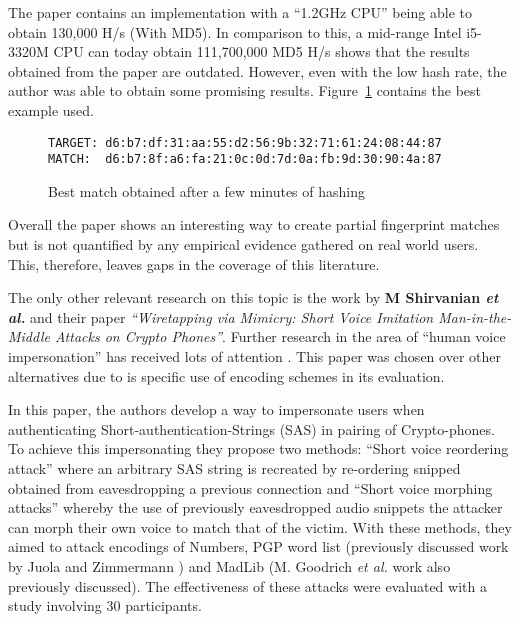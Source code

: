 The paper contains an implementation with a ``1.2GHz CPU'' being able to obtain 130,000 H/s (With MD5). In comparison to this, a mid-range Intel i5-3320M CPU can today obtain 111,700,000 MD5 H/s shows that the results obtained from the paper are outdated. However, even with the low hash rate, the author was able to obtain some promising results. Figure~\ref{ref:fuzz} contains the best example used.

\begin{figure}[!h]
    \begin{center}
        \verb|TARGET: d6:b7:df:31:aa:55:d2:56:9b:32:71:61:24:08:44:87|
        \verb|MATCH:  d6:b7:8f:a6:fa:21:0c:0d:7d:0a:fb:9d:30:90:4a:87|
    \end{center}
    \caption{Best match obtained after a few minutes of hashing}
    \label{ref:fuzz}
\end{figure}

Overall the paper shows an interesting way to create partial fingerprint matches but is not quantified by any empirical evidence gathered on real world users. This, therefore, leaves gaps in the coverage of this literature.

The only other relevant research on this topic is the work by \textbf{M Shirvanian \textit{et al.}}\cite{shirvanian2014wiretapping} 
and their paper \textit{``Wiretapping via Mimicry: Short 
Voice Imitation Man-in-the-Middle Attacks on Crypto 
Phones''}. Further research in the area of ``human voice impersonation'' has received lots of attention \cite{mukhopadhyay2015all}\cite{chen2017you}\cite{wu2015spoofing}. This paper was chosen over other alternatives due to is specific use of encoding schemes in its evaluation.

In this paper, the authors develop a way to 
impersonate users when authenticating 
Short-authentication-Strings (SAS) in pairing of 
Crypto-phones. To achieve this impersonating they propose 
two methods: ``Short voice reordering attack'' where an 
arbitrary SAS string is recreated by re-ordering snipped 
obtained from eavesdropping a previous connection
and ``Short voice morphing attacks'' whereby the use of 
previously eavesdropped audio snippets the attacker can
morph their own voice to match that of the victim. With 
these methods, they aimed to attack encodings of Numbers, 
PGP word list (previously discussed work by Juola and 
Zimmermann \cite{juola1996whole}) and MadLib (M. Goodrich 
\textit{et al.}\cite{goodrich2006loud} work also 
previously discussed). The effectiveness of these attacks 
were evaluated with a study involving 30 participants.

